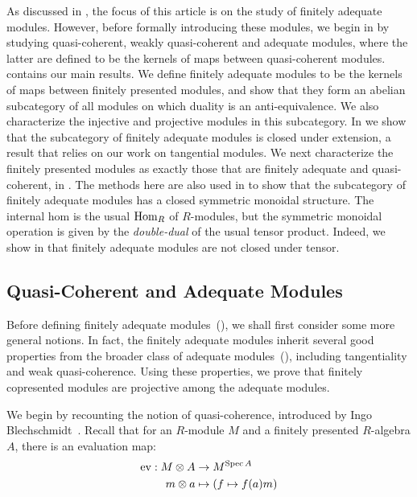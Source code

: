 As discussed in , the focus of this article is on the
study of finitely adequate modules.
However, before formally introducing these modules, we begin in
 by studying quasi-coherent, weakly quasi-coherent
and adequate modules, where the latter are defined to be the kernels of maps
between quasi-coherent modules.
 contains our main results.
We define finitely adequate modules to be the kernels of maps between
finitely presented modules, and show that they form an abelian subcategory
of all modules on which duality is an anti-equivalence.
We also characterize the injective and projective modules in this subcategory.
In  we show that the subcategory of finitely
adequate modules is closed under extension, a result that relies on our work on
tangential modules.
We next characterize the finitely presented modules as exactly those that are
finitely adequate and quasi-coherent, in .
The methods here are also used in  to show that the
subcategory of finitely adequate modules has a closed symmetric monoidal structure.
The internal hom is the usual $\mathrm{Hom}_R$ of $R$-modules, but the symmetric monoidal
operation is given by the \emph{double-dual} of the usual tensor product.
Indeed, we show in  that finitely adequate modules
are not closed under tensor.

\subsection{Quasi-Coherent and Adequate Modules}
\label{ss:qc-and-adequate}

Before defining finitely adequate modules~(), we shall first consider some more general notions.
In fact, the finitely adequate modules inherit several good properties from the broader class of adequate modules~(), including tangentiality and weak quasi-coherence.
Using these properties, we prove that finitely copresented modules are projective among the adequate modules.

We begin by recounting the notion of quasi-coherence, introduced by Ingo Blechschmidt~\cite{ingo-thesis}.
Recall that for an $R$-module $M$ and a finitely presented $R$-algebra $A$, there is an evaluation map:
\begin{align*}
  \mathrm{ev} : M \otimes A & \rightarrow M^{\operatorname{Spec} A} \\
  m \otimes a & \mapsto (f \mapsto f(a)m)
\end{align*}

